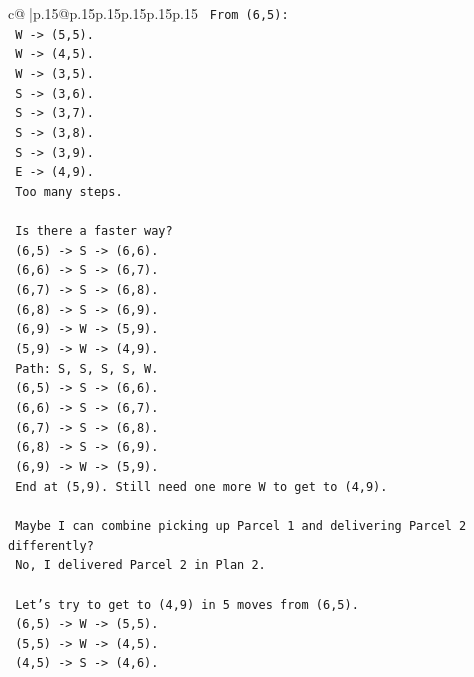\documentclass{article}
\begin{document}
{\begin{supertabular}{c@{$\;$}|p{.15\linewidth}@{}p{.15\linewidth}p{.15\linewidth}p{.15\linewidth}p{.15\linewidth}p{.15\linewidth}}
{{{\texttt{      From (6,5):} \\
\texttt{      W {-}> (5,5).} \\
\texttt{      W {-}> (4,5).} \\
\texttt{      W {-}> (3,5).} \\
\texttt{      S {-}> (3,6).} \\
\texttt{      S {-}> (3,7).} \\
\texttt{      S {-}> (3,8).} \\
\texttt{      S {-}> (3,9).} \\
\texttt{      E {-}> (4,9).} \\
\texttt{      Too many steps.} \\
\\ 
\texttt{      Is there a faster way?} \\
\texttt{      (6,5) {-}> S {-}> (6,6).} \\
\texttt{      (6,6) {-}> S {-}> (6,7).} \\
\texttt{      (6,7) {-}> S {-}> (6,8).} \\
\texttt{      (6,8) {-}> S {-}> (6,9).} \\
\texttt{      (6,9) {-}> W {-}> (5,9).} \\
\texttt{      (5,9) {-}> W {-}> (4,9).} \\
\texttt{      Path: S, S, S, S, W.} \\
\texttt{      (6,5) {-}> S {-}> (6,6).} \\
\texttt{      (6,6) {-}> S {-}> (6,7).} \\
\texttt{      (6,7) {-}> S {-}> (6,8).} \\
\texttt{      (6,8) {-}> S {-}> (6,9).} \\
\texttt{      (6,9) {-}> W {-}> (5,9).} \\
\texttt{      End at (5,9). Still need one more W to get to (4,9).} \\
\\ 
\texttt{      Maybe I can combine picking up Parcel 1 and delivering Parcel 2 differently?} \\
\texttt{      No, I delivered Parcel 2 in Plan 2.} \\
\\ 
\texttt{      Let's try to get to (4,9) in 5 moves from (6,5).} \\
\texttt{      (6,5) {-}> W {-}> (5,5).} \\
\texttt{      (5,5) {-}> W {-}> (4,5).} \\
\texttt{      (4,5) {-}> S {-}> (4,6).} \\
}}}
\end{supertabular}}
\end{document}
